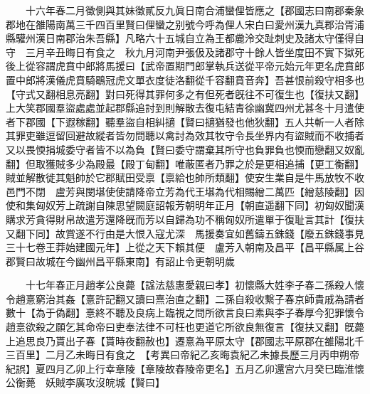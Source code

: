 　　十六年春二月徵側與其妹徵貳反九眞日南合浦蠻俚皆應之【郡國志曰南郡秦象郡地在雒陽南萬三千四百里賢曰俚蠻之别號今呼為俚人宋白曰愛州漢九真郡治胥浦縣驩州漢日南郡治朱吾縣】凡略六十五城自立為王都麊泠交趾刺史及諸太守僅得自守　三月辛丑晦日有食之　秋九月河南尹張伋及諸郡守十餘人皆坐度田不實下獄死後上從容謂虎賁中郎將馬援曰【武帝置期門郎掌執兵送從平帝元始元年更名虎賁郎置中郎將漢儀虎賁騎鶡冠虎文單衣度徒洛翻從千容翻賁音奔】吾甚恨前殺守相多也【守式又翻相息亮翻】對曰死得其罪何多之有但死者旣往不可復生也【復扶又翻】上大笑郡國羣盜處處並起郡縣追討到則解散去復屯結青徐幽冀四州尤甚冬十月遣使者下郡國【下遐稼翻】聽羣盜自相糾擿【賢曰擿猶發也他狄翻】五人共斬一人者除其罪吏雖逗留回避故縱者皆勿問聽以禽討為效其牧守令長坐界内有盜賊而不收捕者又以畏愞捐城委守者皆不以為負【賢曰委守謂棄其所守也負罪負也愞而戀翻又奴亂翻】但取獲賊多少為殿最【殿丁甸翻】唯蔽匿者乃罪之於是更相追捕【更工衡翻】賊並解散徙其魁帥於它郡賦田受禀【禀給也帥所類翻】使安生業自是牛馬放牧不收邑門不閉　盧芳與閔堪使使請降帝立芳為代王堪為代相賜繒二萬匹【繒慈陵翻】因使和集匈奴芳上疏謝自陳思望闕庭詔報芳朝明年正月【朝直遥翻下同】初匈奴聞漢購求芳貪得財帛故遣芳還降旣而芳以自歸為功不稱匈奴所遣單于復耻言其計【復扶又翻下同】故賞遂不行由是大恨入寇尤深　馬援奏宜如舊鑄五銖錢【廢五銖錢事見三十七卷王莽始建國元年】上從之天下賴其便　盧芳入朝南及昌平【昌平縣属上谷郡賢曰故城在今幽州昌平縣東南】有詔止令更朝明歲

　　十七年春正月趙孝公良薨【諡法慈惠愛親曰孝】初懷縣大姓李子春二孫殺人懷令趙憙窮治其姦【憙許記翻又讀曰熹治直之翻】二孫自殺收繫子春京師貴戚為請者數十【為于偽翻】憙終不聽及良病上臨視之問所欲言良曰素與李子春厚今犯罪懷令趙憙欲殺之願乞其命帝曰吏奉法律不可枉也更道它所欲良無復言【復扶又翻】旣薨上追思良乃貰出子春【貰時夜翻赦也】遷憙為平原太守【郡國志平原郡在雒陽北千三百里】二月乙未晦日有食之　【考異曰帝紀乙亥晦袁紀乙未據長歷三月丙申朔帝紀誤】夏四月乙卯上行幸章陵【章陵故舂陵帝更名】五月乙卯還宫六月癸巳臨淮懷公衡薨　妖賊李廣攻沒皖城【賢曰】

